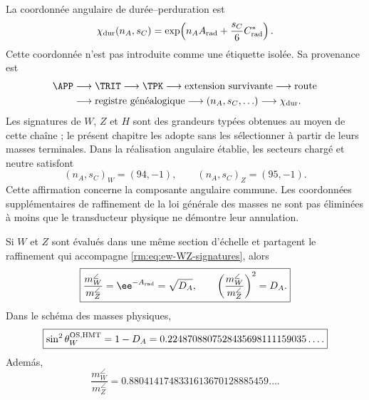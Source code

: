 La coordonnée angulaire de durée--perduration est
\begin{equation}
\label{rm:eq:ew-angular-character}
\chi_{\rm dur}(n_A,s_C)
=\exp\!\left(n_AA_{\rm rad}
+\frac{s_C}{6}C^*_{\rm rad}\right).
\end{equation}
Cette coordonnée n'est pas introduite comme une étiquette isolée. Sa provenance est
\begin{equation}
\label{rm:eq:ew-signature-provenance}
\begin{aligned}
\APP&\longrightarrow\TRIT\longrightarrow\TPK
\longrightarrow\text{extension survivante}
\longrightarrow\text{route}\\
&\longrightarrow\text{registre généalogique}
\longrightarrow(n_A,s_C,\ldots)
\longrightarrow\chi_{\rm dur}.
\end{aligned}
\end{equation}
Les signatures de \(W\), \(Z\) et \(H\) sont des grandeurs typées obtenues au moyen de
cette chaîne ; le présent chapitre les adopte sans les sélectionner à partir de
leurs masses terminales. Dans la réalisation angulaire établie, les secteurs
chargé et neutre satisfont
\begin{equation}
\label{rm:eq:ew-WZ-signatures}
(n_A,s_C)_W=(94,-1),
\qquad
(n_A,s_C)_Z=(95,-1).
\end{equation}
Cette affirmation concerne la composante angulaire commune. Les
coordonnées supplémentaires de raffinement de la loi générale des masses ne sont pas
éliminées à moins que le transducteur physique ne démontre leur annulation.

\begin{theorem}
\label{rm:thm:ew-weinberg}
Si \(W\) et \(Z\) sont évalués dans une même section d'échelle et partagent
le raffinement qui accompagne \cref{rm:eq:ew-WZ-signatures}, alors
\begin{equation}
\label{rm:eq:ew-WZ-ratio}
\boxed{
\frac{m_W^{\angle}}{m_Z^{\angle}}
=\ee^{-A_{\rm rad}}=\sqrt{D_A},
\qquad
\left(\frac{m_W^{\angle}}{m_Z^{\angle}}\right)^2=D_A.}
\end{equation}
Dans le schéma des masses physiques,
\begin{equation}
\label{rm:eq:ew-sin2thetaW}
\boxed{
\sin^2\theta_W^{\rm OS,HMT}=1-D_A
=0.2248708807528435698111159035\ldots .}
\end{equation}
Adem\'as,
\begin{equation}
\label{rm:eq:ew-WZ-terminal-ratio}
\frac{m_W^{\angle}}{m_Z^{\angle}}
=0.8804141748331613670128885459\ldots .
\end{equation}
\end{theorem}

